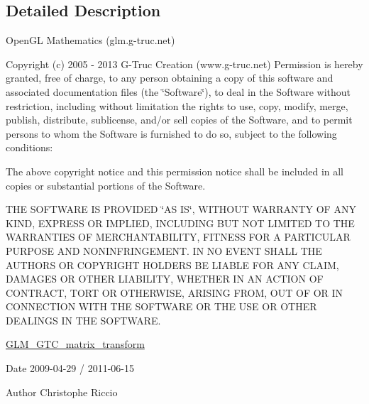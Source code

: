 \subsection{Detailed Description}
Open\+G\+L Mathematics (glm.\+g-\/truc.\+net)

Copyright (c) 2005 -\/ 2013 G-\/\+Truc Creation (www.\+g-\/truc.\+net) Permission is hereby granted, free of charge, to any person obtaining a copy of this software and associated documentation files (the \char`\"{}\+Software\char`\"{}), to deal in the Software without restriction, including without limitation the rights to use, copy, modify, merge, publish, distribute, sublicense, and/or sell copies of the Software, and to permit persons to whom the Software is furnished to do so, subject to the following conditions\+:

The above copyright notice and this permission notice shall be included in all copies or substantial portions of the Software.

T\+H\+E S\+O\+F\+T\+W\+A\+R\+E I\+S P\+R\+O\+V\+I\+D\+E\+D \char`\"{}\+A\+S I\+S\char`\"{}, W\+I\+T\+H\+O\+U\+T W\+A\+R\+R\+A\+N\+T\+Y O\+F A\+N\+Y K\+I\+N\+D, E\+X\+P\+R\+E\+S\+S O\+R I\+M\+P\+L\+I\+E\+D, I\+N\+C\+L\+U\+D\+I\+N\+G B\+U\+T N\+O\+T L\+I\+M\+I\+T\+E\+D T\+O T\+H\+E W\+A\+R\+R\+A\+N\+T\+I\+E\+S O\+F M\+E\+R\+C\+H\+A\+N\+T\+A\+B\+I\+L\+I\+T\+Y, F\+I\+T\+N\+E\+S\+S F\+O\+R A P\+A\+R\+T\+I\+C\+U\+L\+A\+R P\+U\+R\+P\+O\+S\+E A\+N\+D N\+O\+N\+I\+N\+F\+R\+I\+N\+G\+E\+M\+E\+N\+T. I\+N N\+O E\+V\+E\+N\+T S\+H\+A\+L\+L T\+H\+E A\+U\+T\+H\+O\+R\+S O\+R C\+O\+P\+Y\+R\+I\+G\+H\+T H\+O\+L\+D\+E\+R\+S B\+E L\+I\+A\+B\+L\+E F\+O\+R A\+N\+Y C\+L\+A\+I\+M, D\+A\+M\+A\+G\+E\+S O\+R O\+T\+H\+E\+R L\+I\+A\+B\+I\+L\+I\+T\+Y, W\+H\+E\+T\+H\+E\+R I\+N A\+N A\+C\+T\+I\+O\+N O\+F C\+O\+N\+T\+R\+A\+C\+T, T\+O\+R\+T O\+R O\+T\+H\+E\+R\+W\+I\+S\+E, A\+R\+I\+S\+I\+N\+G F\+R\+O\+M, O\+U\+T O\+F O\+R I\+N C\+O\+N\+N\+E\+C\+T\+I\+O\+N W\+I\+T\+H T\+H\+E S\+O\+F\+T\+W\+A\+R\+E O\+R T\+H\+E U\+S\+E O\+R O\+T\+H\+E\+R D\+E\+A\+L\+I\+N\+G\+S I\+N T\+H\+E S\+O\+F\+T\+W\+A\+R\+E.

\hyperlink{group__gtc__matrix__transform}{G\+L\+M\+\_\+\+G\+T\+C\+\_\+matrix\+\_\+transform}

\begin{DoxyDate}{Date}
2009-\/04-\/29 / 2011-\/06-\/15 
\end{DoxyDate}
\begin{DoxyAuthor}{Author}
Christophe Riccio 
\end{DoxyAuthor}
